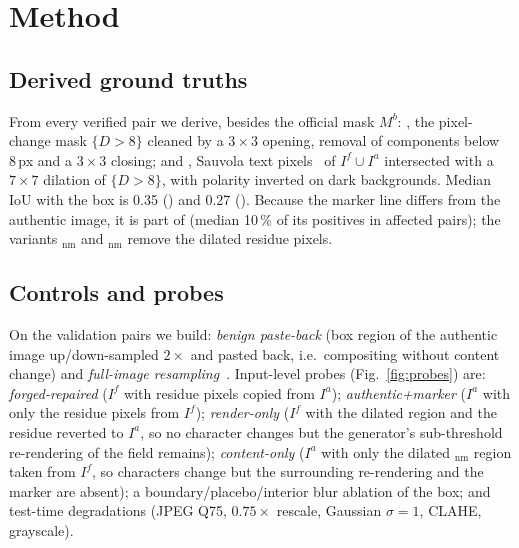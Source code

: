 \section{Method}
\label{sec:method}
\subsection{Derived ground truths}
From every verified pair we derive, besides the official \GTb{} mask $M^{b}$: \GTp{}, the pixel-change mask $\{D>8\}$ cleaned by a $3{\times}3$ opening, removal of components below 8\,px and a $3{\times}3$ closing; and \GTg{}, Sauvola text pixels~\cite{sauvola2000binarization} of $I^f\cup I^a$ intersected with a $7{\times}7$ dilation of $\{D>8\}$, with polarity inverted on dark backgrounds. Median IoU with the box is 0.35 (\GTp{}) and 0.27 (\GTg{}). Because the marker line differs from the authentic image, it is part of \GTp{} (median 10\,\% of its positives in affected pairs); the variants \GTp$_{\mathrm{nm}}$ and \GTg$_{\mathrm{nm}}$ remove the dilated residue pixels.

\subsection{Controls and probes}
On the validation pairs we build: \emph{benign paste-back} (box region of the authentic image up/down-sampled $2\times$ and pasted back, i.e.\ compositing without content change) and \emph{full-image resampling}~\cite{mareen2024tgif}. Input-level probes (Fig.~\ref{fig:probes}) are: \emph{forged-repaired} ($I^f$ with residue pixels copied from $I^a$); \emph{authentic+marker} ($I^a$ with only the residue pixels from $I^f$); \emph{render-only} ($I^f$ with the dilated \GTp{} region and the residue reverted to $I^a$, so no character changes but the generator's sub-threshold re-rendering of the field remains); \emph{content-only} ($I^a$ with only the dilated \GTp$_{\mathrm{nm}}$ region taken from $I^f$, so characters change but the surrounding re-rendering and the marker are absent); a boundary/placebo/interior blur ablation of the box; and test-time degradations (JPEG Q75, $0.75\times$ rescale, Gaussian $\sigma{=}1$, CLAHE, grayscale).

